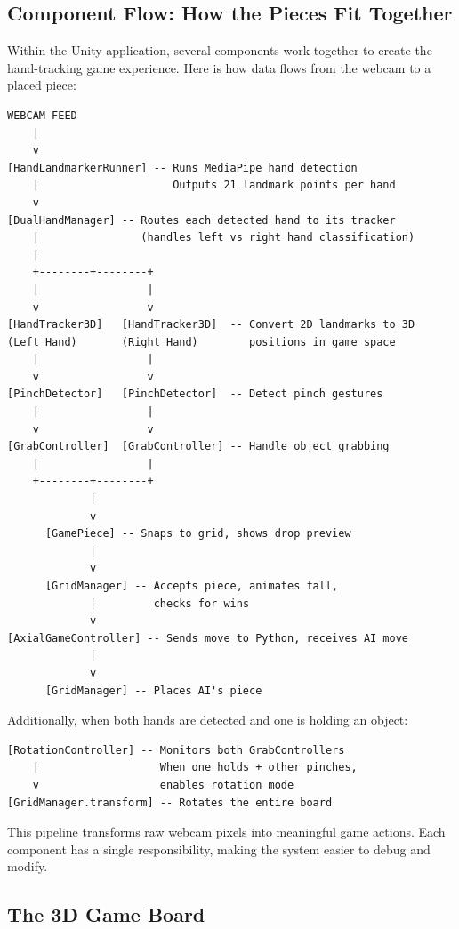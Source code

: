 \documentclass[11pt]{article}
\begin{document}
\subsection{Component Flow: How the Pieces Fit Together}

Within the Unity application, several components work together to create the hand-tracking game experience. Here is how data flows from the webcam to a placed piece:

\begin{verbatim}
WEBCAM FEED
    |
    v
[HandLandmarkerRunner] -- Runs MediaPipe hand detection
    |                     Outputs 21 landmark points per hand
    v
[DualHandManager] -- Routes each detected hand to its tracker
    |                (handles left vs right hand classification)
    |
    +--------+--------+
    |                 |
    v                 v
[HandTracker3D]   [HandTracker3D]  -- Convert 2D landmarks to 3D
(Left Hand)       (Right Hand)        positions in game space
    |                 |
    v                 v
[PinchDetector]   [PinchDetector]  -- Detect pinch gestures
    |                 |
    v                 v
[GrabController]  [GrabController] -- Handle object grabbing
    |                 |
    +--------+--------+
             |
             v
      [GamePiece] -- Snaps to grid, shows drop preview
             |
             v
      [GridManager] -- Accepts piece, animates fall,
             |         checks for wins
             v
[AxialGameController] -- Sends move to Python, receives AI move
             |
             v
      [GridManager] -- Places AI's piece
\end{verbatim}

Additionally, when both hands are detected and one is holding an object:

\begin{verbatim}
[RotationController] -- Monitors both GrabControllers
    |                   When one holds + other pinches,
    v                   enables rotation mode
[GridManager.transform] -- Rotates the entire board
\end{verbatim}

This pipeline transforms raw webcam pixels into meaningful game actions. Each component has a single responsibility, making the system easier to debug and modify.


\subsection{The 3D Game Board}
\end{document}
